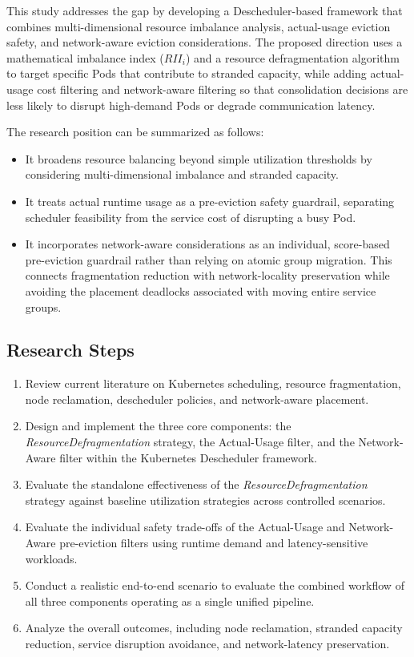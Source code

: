 This study addresses the gap by developing a Descheduler-based framework that combines multi-dimensional resource imbalance analysis, actual-usage eviction safety, and network-aware eviction considerations. The proposed direction uses a mathematical imbalance index ($RII_i$) and a resource defragmentation algorithm to target specific Pods that contribute to stranded capacity, while adding actual-usage cost filtering and network-aware filtering so that consolidation decisions are less likely to disrupt high-demand Pods or degrade communication latency.

The research position can be summarized as follows:
\begin{itemize}
    \item It broadens resource balancing beyond simple utilization thresholds by considering multi-dimensional imbalance and stranded capacity.
    \item It treats actual runtime usage as a pre-eviction safety guardrail, separating scheduler feasibility from the service cost of disrupting a busy Pod.
    \item It incorporates network-aware considerations as an individual, score-based pre-eviction guardrail rather than relying on atomic group migration. This connects fragmentation reduction with network-locality preservation while avoiding the placement deadlocks associated with moving entire service groups.
\end{itemize}

\subsection{Research Steps}
\label{sec:langkahPenelitian}

\begin{enumerate}
    \item Review current literature on Kubernetes scheduling, resource fragmentation, node reclamation, descheduler policies, and network-aware placement.
    \item Design and implement the three core components: the \textit{ResourceDefragmentation} strategy, the Actual-Usage filter, and the Network-Aware filter within the Kubernetes Descheduler framework.
    \item Evaluate the standalone effectiveness of the \textit{ResourceDefragmentation} strategy against baseline utilization strategies across controlled scenarios.
    \item Evaluate the individual safety trade-offs of the Actual-Usage and Network-Aware pre-eviction filters using runtime demand and latency-sensitive workloads.
    \item Conduct a realistic end-to-end scenario to evaluate the combined workflow of all three components operating as a single unified pipeline.
    \item Analyze the overall outcomes, including node reclamation, stranded capacity reduction, service disruption avoidance, and network-latency preservation.
\end{enumerate}
